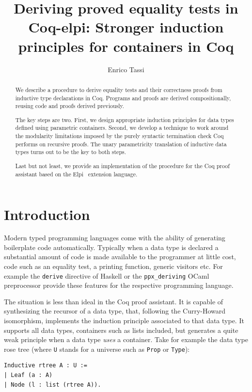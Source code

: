 \documentclass[a4paper,UKenglish,cleveref, autoref]{lipics-v2019}
\title{Deriving proved equality tests in Coq-elpi: Stronger induction principles for containers in Coq}
\author{Enrico Tassi}{Universit\'e c\^ote d'Azur - Inria}{Enrico.Tassi@inria.fr}{}{}          %
\begin{document}
\maketitle

\begin{abstract}
We describe a procedure to derive equality tests and their correctness
proofs from inductive type declarations in Coq.  Programs and proofs
are derived compositionally, reusing code and proofs derived
previously.  

The key steps are two. First, we
design appropriate induction principles for data types defined
using parametric containers. Second, we
develop a technique to work around the modularity limitations
imposed by the purely syntactic termination check Coq performs
on recursive proofs. 
The unary parametricity translation of inductive data types
turns out to be the key to both steps.

Last but not least, we provide an implementation of the procedure
	for the Coq proof assistant based on the Elpi~\cite{dunchev:hal-01176856} extension language.
\end{abstract}


\section{Introduction}

Modern typed programming languages come with the ability of generating
boilerplate code automatically. Typically when a data type is declared
a substantial amount of code is made available to the programmer at
little cost, code such as an equality test, a printing function,
generic visitors etc.  For example the \lstinline+derive+ directive of
Haskell or the
\lstinline+ppx_deriving+ OCaml preprocessor
provide these features for the respective programming language.

The situation is less than ideal in the Coq proof assistant.  It is
capable of synthesizing the recursor of a data type, that,
following the Curry-Howard isomorphism, implements the induction
principle associated to that data type. It supports all data types,
containers such as lists included, but generates a quite weak
principle when a data type \emph{uses} a container.
Take for  example the data type rose tree (where \lstinline+U+ stands for a universe such as \lstinline+Prop+ or \lstinline+Type+):
\begin{lstlisting}
Inductive rtree A : U :=
| Leaf (a : A)
| Node (l : list (rtree A)).
\end{lstlisting}
\end{document}
